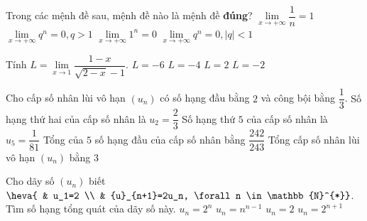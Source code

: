 \begin{ex}%
	Trong các mệnh đề sau, mệnh đề nào là mệnh đề  \textbf{đúng}?
	\choice 
		 {$\lim\limits_{x\to+\infty} \dfrac{1}{n}=1$}
		{$\lim\limits_{x\to+\infty} q^n=0,  q>1$}
		 {$\lim\limits_{x\to+\infty} 1^n=0$}
		{\True  $\lim\limits_{x\to+\infty} q^n=0,|q|<1$}
\end{ex}

\begin{ex}%
	Tính  $L = \lim\limits_{x\to 1} \dfrac{1-x}{\sqrt{2-x}-1}$.
	\choice 
		{$L  = -6$}
		{$L =  -4$}
		{\True $L =  2$}
		{$L =  -2$}
\end{ex}

\begin{ex}%
 Cho cấp số nhân lùi vô hạn $(u_n)$ có số hạng đầu bằng $2$ và công  bội bằng $\dfrac{1}{3}$.
 \choiceTF 
  {\True Số hạng thứ  hai của cấp số nhân là $u_2=\dfrac{2}{3}$}
  {Số  hạng thứ $5$ của cấp số nhân là $u_5=\dfrac{1}{81}$}
  {Tổng của $5$ số hạng đầu của cấp số nhân bằng  $\dfrac{242}{243}$}
  {\True Tổng  cấp số nhân lùi vô hạn $(u_n)$ bằng $3$}
\end{ex}

\begin{ex}%
	Cho  dãy số $\left(u_n\right)$ biết $\heva{
	& u_1=2 \\ 
	& {u}_{n+1}=2u_n, \forall n  \in \mathbb{N}^{*}}$. Tìm số hạng tổng quát của dãy số này.
	 \choice
		{\True  $u_n=2^n$}
		 {$u_n={n}^{n-1}$}
		 {$u_n=2$}
		{$u_n={2}^{n+1}$} 
\end{ex}

